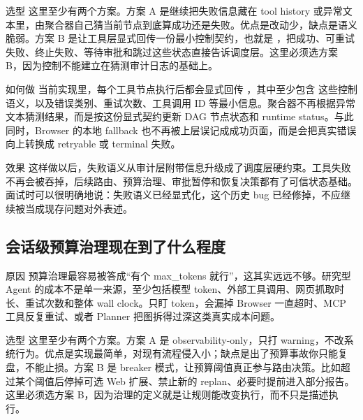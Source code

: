 \documentclass[12pt]{article}
\begin{document}
\begin{qaBox}{选型}
这里至少有两个方案。方案 A 是继续把失败信息藏在 tool history 或异常文本里，由聚合器自己猜当前节点到底算成功还是失败。优点是改动少，缺点是语义脆弱。方案 B 是让工具层显式回传一份最小控制契约，也就是 ，把成功、可重试失败、终止失败、等待审批和跳过这些状态直接告诉调度层。这里必须选方案 B，因为控制不能建立在猜测审计日志的基础上。
\end{qaBox}

\begin{qaBox}{如何做}
当前实现里，每个工具节点执行后都会显式回传 ，其中至少包含  这些控制语义，以及错误类别、重试次数、工具调用 ID 等最小信息。聚合器不再根据异常文本猜测结果，而是按这份显式契约更新 DAG 节点状态和 runtime status。与此同时，Browser 的本地 fallback 也不再被上层误记成成功页面，而是会把真实错误向上转换成 retryable 或 terminal 失败。
\end{qaBox}

\begin{qaBox}{效果}
这样做以后，失败语义从审计层附带信息升级成了调度层硬约束。工具失败不再会被吞掉，后续路由、预算治理、审批暂停和恢复决策都有了可信状态基础。面试时可以很明确地说：失败语义已经显式化，这个历史 bug 已经修掉，不应继续被当成现存问题对外表述。
\end{qaBox}

\subsection{会话级预算治理现在到了什么程度}
\begin{qaBox}{原因}
预算治理最容易被答成“有个 max\_tokens 就行”，这其实远远不够。研究型 Agent 的成本不是单一来源，至少包括模型 token、外部工具调用、网页抓取时长、重试次数和整体 wall clock。只盯 token，会漏掉 Browser 一直超时、MCP 工具反复重试、或者 Planner 把图拆得过深这类真实成本问题。
\end{qaBox}

\begin{qaBox}{选型}
这里至少有两个方案。方案 A 是 observability-only，只打 warning，不改系统行为。优点是实现最简单，对现有流程侵入小；缺点是出了预算事故你只能复盘，不能止损。方案 B 是 breaker 模式，让预算阈值真正参与路由决策。比如超过某个阈值后停掉可选 Web 扩展、禁止新的 replan、必要时提前进入部分报告。这里必须选方案 B，因为治理的定义就是让规则能改变执行，而不只是描述执行。
\end{qaBox}
\end{document}
